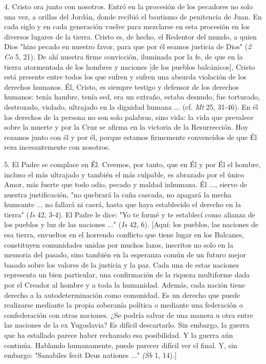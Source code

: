 \begin{body}
4. Cristo ora junto con nosotros. Entró en la procesión de los pecadores no solo una vez, a orillas del Jordán, donde recibió el bautismo de penitencia de Juan. En cada siglo y en cada generación vuelve para mezclarse en esta procesión en los diversos lugares de la tierra. Cristo es, de hecho, el Redentor del mundo, a quien Dios "hizo pecado en nuestro favor, para que por él seamos justicia de Dios" (\emph{2 Co} 5, 21). De ahí nuestra firme convicción, iluminada por la fe, de que en la tierra atormentada de los hombres y naciones {[}de los pueblos balcánicos{]}, Cristo está presente entre todos los que sufren y sufren una absurda violación de los derechos humanos. Él, Cristo, es siempre testigo y defensor de los derechos humanos: tenía hambre, tenía sed, era un extraño, estaba desnudo, fue torturado, destrozado, violado, ultrajado en la dignidad humana ... (cf. \emph{Mt} 25, 31-46). En él los derechos de la persona no son solo palabras, sino vida: la vida que prevalece sobre la muerte y por la Cruz se afirma en la victoria de la Resurrección. Hoy rezamos junto con él y por él, porque estamos firmemente convencidos de que Él reza incesantemente con nosotros.

5. El Padre se complace en Él. Creemos, por tanto, que en Él y por Él el hombre, incluso el más ultrajado y también el más culpable, es abrazado por el único Amor, más fuerte que todo odio, pecado y maldad inhumana. Él ..., siervo de nuestra justificación, "no quebrará la caña cascada, no apagará la mecha humeante ... no fallará ni caerá, hasta que haya establecido el derecho en la tierra" (\emph{Is} 42, 3-4). El Padre le dice: "Yo te formé y te establecí como alianza de los pueblos y luz de las naciones ..." (\emph{Is} 42, 6). {[}Aquí: los pueblos, las naciones de esa tierra, envueltos en el horrendo conflicto que tiene lugar en los Balcanes, constituyen comunidades unidas por muchos lazos, inscritos no solo en la memoria del pasado, sino también en la esperanza común de un futuro mejor basado sobre los valores de la justicia y la paz. Cada una de estas naciones representa un bien particular, una confirmación de la riqueza multiforme dada por el Creador al hombre y a toda la humanidad. Además, cada nación tiene derecho a la autodeterminación como comunidad. Es un derecho que puede realizarse mediante la propia soberanía política o mediante una federación o confederación con otras naciones. ¿Se podría salvar de una manera u otra entre las naciones de la ex Yugoslavia? Es difícil descartarlo. Sin embargo, la guerra que ha estallado parece haber rechazado esa posibilidad. Y la guerra aún continúa. Hablando humanamente, puede parecer difícil ver el final. Y, sin embargo: "Sanabiles fecit Deus nationes ..." \emph{(Sb} 1, 14).{]}


\end{body}
